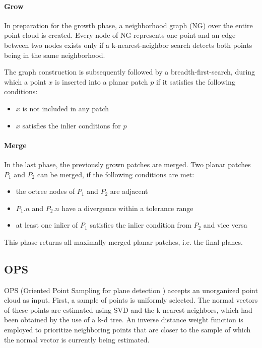 \documentclass[main.tex]{subfiles}
\begin{document}
\paragraph*{Grow}
In preparation for the growth phase, a neighborhood graph (NG) over the entire point cloud is created. Every node of NG represents one point and an edge between two nodes exists only if
a k-nearest-neighbor search detects both points being in the same neighborhood.

The graph construction is subsequently followed by a breadth-first-search, during which a point $x$ is inserted into a planar patch $p$ if it satisfies the following conditions:
\begin{itemize}
    \item $x$ is not included in any patch
    \item $x$ satisfies the inlier conditions for $p$ %
\end{itemize}

\paragraph*{Merge}
In the last phase, the previously grown patches are merged. Two planar patches $P_1$ and $P_2$ can be merged, if the following conditions are met:
\begin{itemize}
    \item the octree nodes of $P_1$ and $P_2$ are adjacent
    \item $P_1.n$ and $P_2.n$ have a divergence within a tolerance range
    \item at least one inlier of $P_1$ satisfies the inlier condition from $P_2$ and vice versa
\end{itemize}

This phase returns all maximally merged planar patches, i.e. the final planes.

\subsection{OPS}
OPS (Oriented Point Sampling for plane detection \cite{Sun_Mordohai_2019}) accepts an unorganized point cloud as input.
First, a sample of points is uniformly selected. The normal vectors of these points are estimated using SVD and the k nearest neighbors, which had been obtained by the use of a k-d tree.
An inverse distance weight function is employed to prioritize neighboring points that are closer to the sample of which the normal vector is currently being estimated.
\end{document}
